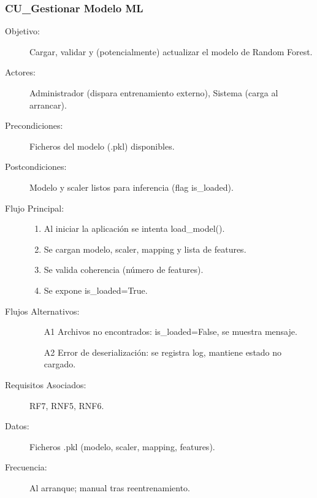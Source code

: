 \subsubsection{CU\_Gestionar Modelo ML}
\begin{description}
  \item[Objetivo:] Cargar, validar y (potencialmente) actualizar el modelo de Random Forest.
  \item[Actores:] Administrador (dispara entrenamiento externo), Sistema (carga al arrancar).
  \item[Precondiciones:] Ficheros del modelo (.pkl) disponibles.
  \item[Postcondiciones:] Modelo y scaler listos para inferencia (flag is\_loaded).
  \item[Flujo Principal:]
    \begin{enumerate}
      \item Al iniciar la aplicación se intenta load\_model().
      \item Se cargan modelo, scaler, mapping y lista de features.
      \item Se valida coherencia (número de features).
      \item Se expone is\_loaded=True.
    \end{enumerate}
  \item[Flujos Alternativos:]
    \begin{enumerate}
      \item[A1] Archivos no encontrados: is\_loaded=False, se muestra mensaje.
      \item[A2] Error de deserialización: se registra log, mantiene estado no cargado.
    \end{enumerate}
  \item[Requisitos Asociados:] RF7, RNF5, RNF6.
  \item[Datos:] Ficheros .pkl (modelo, scaler, mapping, features).
  \item[Frecuencia:] Al arranque; manual tras reentrenamiento.
\end{description}

